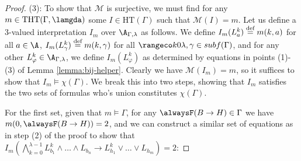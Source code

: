 \begin{proof}
  (3): To show that $\mathcal{M}$ is surjective, we must find for any
  $m \in \text{THT}(\Gamma,\lamgda)$ some $I \in \text{HT}(\Gamma)$
  such that $\mathcal{M}(I) = m$. Let us define a 3-valued
  interpretation $I_m$ over $\A_{\Gamma,\lambda}$ as follows. We
  define $I_m(L_{a}^k) \stackrel{\text{def}}{=} m(k,a)$ for all $a \in \A$,
  $I_m(L^k_{\gamma}) \stackrel{\text{def}}{=} m(k,\gamma)$ for all
  $\kinlambda, \gamma \in subf(\Gamma)$, and for any other
  $L^k_\varphi \in \A_{\Gamma,\lambda}$, we define
  $I_m(L^k_{\varphi})$ as determined by equations in points (1)-(3) of
  Lemma \ref{lemma:bij-helper}. Clearly we have
  $\mathcal{M}(I_m) = m$, so it suffices to show that
  $I_m \models \chi(\Gamma)$. We break this into two steps, showing
  that $I_m$ satisfies the two sets of formulas who's union
  constitutes $\chi(\Gamma)$.

  For the first set, given that $m \models \Gamma$, for any
  $\tempruleshort \in \Gamma$ we have $m(0,\tempruleshort)=2$, and we
  can construct a similar set of equations as in step (2) of the proof
  to show that
  $I_m(\bigwedge_{k=0}^{\lambda-1} L_{b_1}^k \land \dots \land L_{b_n}
  \rightarrow L_{h_1}^k \lor \dots \lor L_{h_m}) = 2$:


\end{proof}
